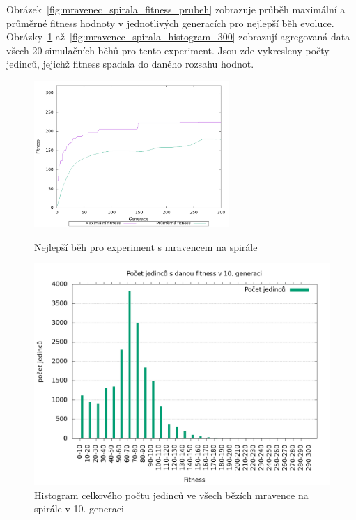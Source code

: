 Obrázek~\ref{fig:mravenec_spirala_fitness_prubeh} zobrazuje průběh maximální a průměrné fitness hodnoty v jednotlivých generacích pro nejlepší běh evoluce.
Obrázky~\ref{fig:mravenec_spirala_histogram_10} až~\ref{fig:mravenec_spirala_histogram_300} zobrazují agregovaná data všech 20 simulačních běhů pro tento experiment.
Jsou zde vykresleny počty jedinců, jejichž fitness spadala do daného rozsahu hodnot.

\begin{figure}[h]
    \begin{minipage}[c]{0.48\linewidth}
    {\includegraphics[width=20em]{obrazky/mravenec_spirala_fitness_prubeh.png}}
        \caption{
        Nejlepší běh pro experiment s mravencem na spirále
        }
        \label{fig:mravenec_spirala_fitness_prubeh}
    \end{minipage}
    \hfill
    \begin{minipage}[c]{0.48\linewidth}
        \includegraphics[width=\linewidth]{obrazky/mravenec_spirala_fitnessHistogram10.png}
        \caption{Histogram celkového počtu jedinců ve všech bězích mravence na spirále v 10. generaci}
        \label{fig:mravenec_spirala_histogram_10}
    \end{minipage}
\end{figure}

